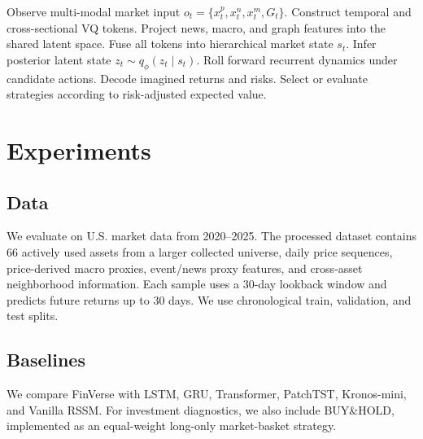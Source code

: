 \documentclass[letterpaper]{article}
\begin{document}
\begin{algorithm}[t]
\caption{FinVerse World Model Learning and Strategy Evaluation}
\label{alg:finverse}
\begin{algorithmic}[1]
\STATE Observe multi-modal market input $o_t=\{x_t^p,x_t^n,x_t^m,G_t\}$.
\STATE Construct temporal and cross-sectional VQ tokens.
\STATE Project news, macro, and graph features into the shared latent space.
\STATE Fuse all tokens into hierarchical market state $s_t$.
\STATE Infer posterior latent state $z_t \sim q_\phi(z_t \mid s_t)$.
\STATE Roll forward recurrent dynamics under candidate actions.
\STATE Decode imagined returns and risks.
\STATE Select or evaluate strategies according to risk-adjusted expected value.
\end{algorithmic}
\end{algorithm}

\section{Experiments}
\subsection{Data}
We evaluate on U.S. market data from 2020--2025. The processed dataset contains 66 actively used assets from a larger collected universe, daily price sequences, price-derived macro proxies, event/news proxy features, and cross-asset neighborhood information. Each sample uses a 30-day lookback window and predicts future returns up to 30 days. We use chronological train, validation, and test splits.

\subsection{Baselines}
We compare FinVerse with LSTM, GRU, Transformer, PatchTST, Kronos-mini, and Vanilla RSSM. For investment diagnostics, we also include BUY\&HOLD, implemented as an equal-weight long-only market-basket strategy.
\end{document}
